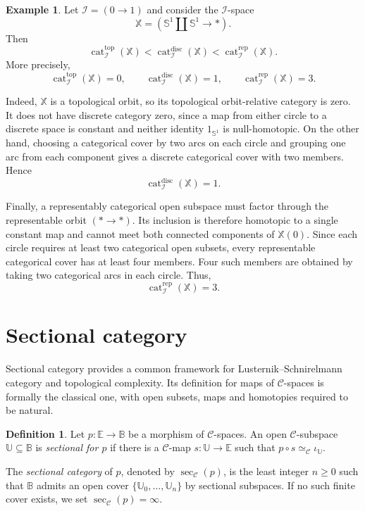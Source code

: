 \documentclass[12pt]{amsart}
\theoremstyle{definition}
\newtheorem{defi}[teo]{Definition}
\newtheorem{ex}[teo]{Example}
\theoremstyle{remark}
\numberwithin{figure}{section}%
\newcommand{\CC}{\mathcal{C}}
\newcommand{\cat}{\mathop{\mathrm{cat}}}
\newcommand{\X}{\mathbb{X}}
\newcommand{\Ee}{\mathbb{E}}
\newcommand{\Bb}{\mathbb{B}}
\newcommand{\Uu}{\mathbb{U}}
\begin{document}
\begin{ex}\label{ex:three-orbit-categories-distinct}
Let $\mathcal I=(0\to1)$ and consider the $\mathcal I$-space
\[
\X=
\left(
\mathbb S^1\amalg\mathbb S^1
\longrightarrow
*
\right).
\]
Then
\[
\cat_{\mathcal I}^{\mathrm{top}}(\X)
<
\cat_{\mathcal I}^{\mathrm{disc}}(\X)
<
\cat_{\mathcal I}^{\mathrm{rep}}(\X).
\]
More precisely,
\[
\cat_{\mathcal I}^{\mathrm{top}}(\X)=0,
\qquad
\cat_{\mathcal I}^{\mathrm{disc}}(\X)=1,
\qquad
\cat_{\mathcal I}^{\mathrm{rep}}(\X)=3.
\]

Indeed, $\X$ is a topological orbit, so its topological orbit-relative
category is zero. It does not have discrete category zero, since a map
from either circle to a discrete space is constant and neither identity
$1_{\mathbb S^1}$ is null-homotopic. On the other hand, choosing a
categorical cover by two arcs on each circle and grouping one arc from
each component gives a discrete categorical cover with two members.
Hence
\[
\cat_{\mathcal I}^{\mathrm{disc}}(\X)=1.
\]

Finally, a representably categorical open subspace must factor through
the representable orbit $(*\to*)$. Its inclusion is therefore homotopic
to a single constant map and cannot meet both connected components of
$\X(0)$. Since each circle requires at least two categorical open
subsets, every representable categorical cover has at least four
members. Four such members are obtained by taking two categorical arcs
in each circle. Thus,
\[
\cat_{\mathcal I}^{\mathrm{rep}}(\X)=3.
\]
\end{ex}

\section{Sectional category}
\label{sec:sectional-category}

Sectional category provides a common framework for
Lusternik--Schnirelmann category and topological complexity. Its
definition for maps of $\CC$-spaces is formally the classical one, with
open subsets, maps and homotopies required to be natural.

\begin{defi}\label{def:sectional-category-diagram}
Let $p\colon\Ee\to\Bb$ be a morphism of $\CC$-spaces. An open
$\CC$-subspace $\Uu\subseteq\Bb$ is \emph{sectional for $p$} if there
is a $\CC$-map $s\colon\Uu\to\Ee$ such that
$p\circ s\simeq_{\CC}\iota_{\Uu}$.

The \emph{sectional category} of $p$, denoted by $\sec_{\CC}(p)$, is the
least integer $n\geq0$ such that $\Bb$ admits an open cover
$\{\Uu_0,\ldots,\Uu_n\}$ by sectional subspaces. If no such finite cover
exists, we set $\sec_{\CC}(p)=\infty$.
\end{defi}
\end{document}
